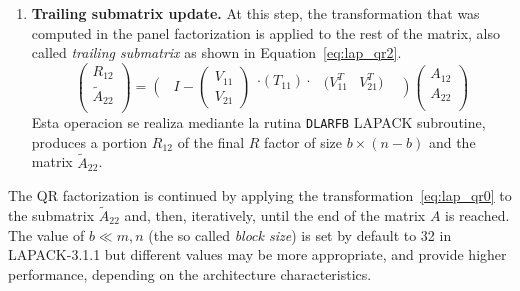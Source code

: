 \documentclass[runningheads]{llncs}
\begin{document}
\begin{enumerate}
\item {\bf Trailing submatrix update.} At this step, the
  transformation that was computed in the panel factorization is
  applied to the rest of the matrix, also called {\it trailing
    submatrix} as shown in Equation~\eqref{eq:lap_qr2}.
  \begin{equation}
    \label{eq:lap_qr2}
    \left(\begin{array}{c}
        R_{12}       \\
        \tilde{A}_{22}\\
      \end{array}\right) =
    \left(\begin{array}{c}
        \\
        \\
      \end{array}\right.  I - \left(\begin{array}{c}
        V_{11} \\
        V_{21}
      \end{array}\right) \begin{array}{c}
      \cdot (T_{11}) \cdot\\
      \\
    \end{array}   \begin{array}{cc}
      (V^T_{11}& V^T_{21}) \\
      &          \\
    \end{array}\left.\begin{array}{c}
        \\
        \\
      \end{array}\right)  \left(\begin{array}{c}
        A_{12}  \\
        A_{22}  \\
      \end{array}\right)
  \end{equation}
  Esta operacion se realiza mediante la rutina \texttt{DLARFB} LAPACK
  subroutine, produces a portion $R_{12}$ of the final $R$ factor of
  size $b \times (n-b)$ and the matrix $\tilde{A}_{22}$.
\end{enumerate}

The QR factorization is continued by applying the
transformation~\eqref{eq:lap_qr0} to the submatrix $\tilde{A}_{22}$
and, then, iteratively, until the end of the matrix $A$ is reached. The
value of $b \ll m,n$ (the so called {\it block size}) is set by default to
32 in LAPACK-3.1.1 but different values may be more appropriate, and provide higher
performance, depending on the architecture characteristics.
\end{document}
